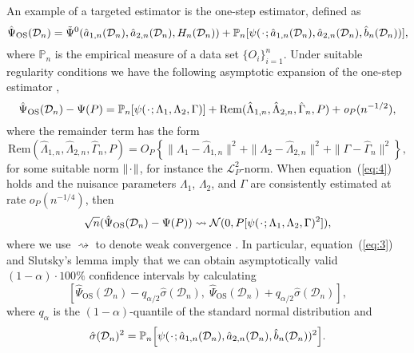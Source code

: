 \documentclass[11pt]{article}
\theoremstyle{thmstyleone}%
\theoremstyle{thmstyletwo}%
\theoremstyle{thmstylethree}%
\newcommand{\blank}{\makebox[1ex]{\textbf{$\cdot$}}}
\newcommand{\weakly}{\rightsquigarrow}
\newcommand\smallO{\textit{o}}
\newcommand\bigO{\textit{O}}
\newcommand{\1}{\mathds{1}}
\newcommand{\empmeas}{\ensuremath{\mathbb{P}_n}} %
\newcommand{\data}{\ensuremath{\mathcal{D}}}
\begin{document}
An example of a targeted estimator is the one-step estimator, defined as
\begin{equation}
    \label{eq:one-step-def}
    \hat{\Psi}_{\text{OS}}(\data_n)
    =
    \tilde{\Psi}^0(\hat{a}_{1,n}(\data_n), \hat{a}_{2,n}(\data_n),
    H_n(\data_n))
    + \empmeas{[\psi(\blank; \hat{a}_{1,n}(\data_n), \hat{a}_{2,n}(\data_n),
      \hat{b}_n(\data_n) )]},
\end{equation}
where \( \empmeas \) is the empirical measure of a data set
\(\{O_i\}_{i=1}^n\).
Under suitable regularity conditions
we have the
following asymptotic expansion of the one-step estimator
\citep{pfanzagl1985contributions,van2003unified,fisher2021visually,kennedy2022semiparametric},
\begin{equation*}
  \hat{\Psi}_{\text{OS}}(\data_n)- \Psi(P)
  =  \empmeas{[\psi(\blank ; \Lambda_1, \Lambda_2, \Gamma)]}
  +\mathrm{Rem}{(\hat{\Lambda}_{1,n},\hat{\Lambda}_{2,n},  \hat{\Gamma}_n, P)} + \smallO_{P}(n^{-1/2}),
\end{equation*}
where the remainder term has the form
\begin{equation}
  \label{eq:4}
  \mathrm{Rem}{(\hat{\Lambda}_{1,n},\hat{\Lambda}_{2,n},  \hat{\Gamma}_n, P)}
  = \bigO_P{
    \left\{
      \|\Lambda_1-\hat{\Lambda}_{1,n}\|^2
      +
      \|\Lambda_2-\hat{\Lambda}_{2,n}\|^2
      +
      \|\Gamma-\hat{\Gamma}_{n}\|^2
    \right\}
  },
\end{equation}
for some suitable norm \( \|\blank \| \), for instance the
\( \mathcal{L}_{P}^2 \)-norm. When equation~(\ref{eq:4}) holds and the
nuisance parameters $\Lambda_1$, $\Lambda_2$, and $\Gamma$ are
consistently estimated at rate \( \smallO_P{(n^{-1/4})} \), then
\begin{equation}
  \label{eq:3}
  \sqrt{n}(\hat{\Psi}_{\text{OS}}(\data_n)- \Psi(P)) \weakly \mathcal{N}(0,
  P{[\psi(\blank; \Lambda_1, \Lambda_2, \Gamma)^2]}),
\end{equation}
where we use \( \weakly \) to denote weak convergence \citep{van2000asymptotic}.
In particular, equation~(\ref{eq:3}) and Slutsky's lemma imply that we can
obtain asymptotically valid \((1-\alpha)\cdot100\%\) confidence intervals by
calculating
\begin{equation*}
  \left[
    \hat{\Psi}_{\text{OS}}(\data_n) - q_{\alpha/2} \hat{\sigma}(\data_n) ,
    \;
    \hat{\Psi}_{\text{OS}}(\data_n) + q_{\alpha/2} \hat{\sigma}(\data_n)
  \right],
\end{equation*}
where \( q_{\alpha} \) is the \( (1-\alpha) \)-quantile of the standard normal
distribution and
\begin{equation*}
  \hat{\sigma}(\data_n)^2 = \empmeas{ \left[ \psi(\blank;
      \hat{a}_{1,n}(\data_n), \hat{a}_{2,n}(\data_n), \hat{b}_n(\data_n))^2
    \right]}.
\end{equation*}
\end{document}
